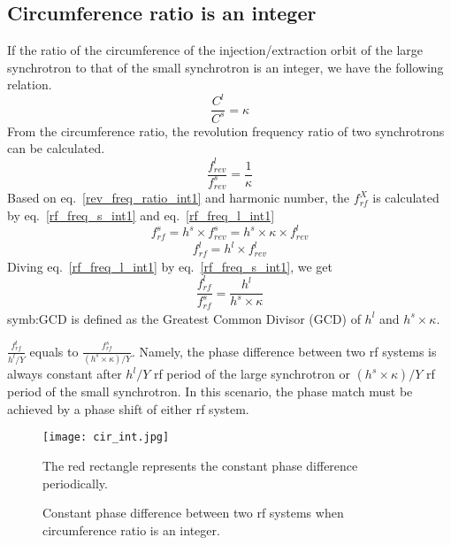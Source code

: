 \subsection{Circumference ratio is an integer}
\label{sec:cir_integer}
If the ratio of the circumference of the injection/extraction orbit of the large synchrotron to that of the small synchrotron is an integer, we have the following relation. 
\begin{equation}
\frac{C^l}{C^s}=\kappa \label{circumference_ratio_int1}
\end{equation}
From the circumference ratio, the revolution frequency ratio of two synchrotrons can be calculated.
\begin{equation}
\frac{f_{\mathit{rev}}^{l}}{f_{\mathit{rev}}^{s}}=\frac{1}{\kappa} \label{rev_freq_ratio_int1}
\end{equation}
Based on eq.~\ref{rev_freq_ratio_int1} and harmonic number, the $f_{rf}^{X}$ is calculated by eq.~\ref{rf_freq_s_int1} and eq.~\ref{rf_freq_l_int1}
\begin{equation} 
f_{\mathit{rf}}^{s}= h^s \times f_{\mathit{rev}}^{s}=h^s \times \kappa \times f_{rev}^{l} \label{rf_freq_s_int1}
\end{equation}
\begin{equation} 
f_{\mathit{rf}}^{l}= h^l \times f_{\mathit{rev}}^{l} \label{rf_freq_l_int1}
\end{equation}
Diving eq.~\ref{rf_freq_l_int1} by eq.~\ref{rf_freq_s_int1}, we get
\begin{equation} 
\frac{f_{\mathit{rf}}^{l}}{f_{\mathit{rf}}^{s}}= \frac{h^l}{h^s \times \kappa} \label{rf_freq_ratio1}
\end{equation}
\gls{symb:GCD} is defined as the Greatest Common Divisor (\gls{GCD}) of $h^l$ and $h^s \times \kappa$.

$\frac{f_{\mathit{rf}}^{l}}{h^l/Y}$ equals to $\frac{f_{\mathit{rf}}^{s}}{(h^s\times \kappa)/Y}$. Namely, the phase difference between two rf systems is always constant after ${h^l/Y}$ rf period of the large synchrotron or ${(h^s\times \kappa)/Y}$ rf period of the small synchrotron. In this scenario, the phase match must be achieved by a phase shift of either rf system. 
\begin{figure}[!htb]
   \centering   
   \texttt{[image: cir\_int.jpg]}
   \caption{Constant phase difference between two rf systems when circumference ratio is an integer.}{The red rectangle represents the constant phase difference periodically.}
   \label{cir_int}
\end{figure} 

